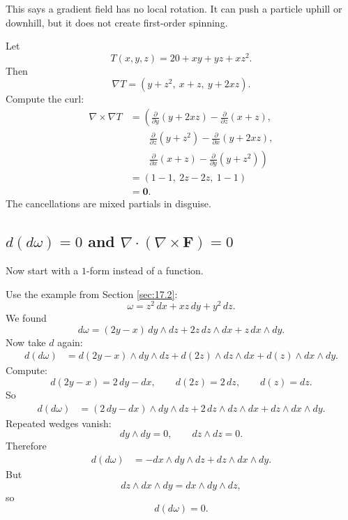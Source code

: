 This says a gradient field has no local rotation.  It can push a particle uphill or
downhill, but it does not create first-order spinning.

\begin{example}
Let
\[
    T(x,y,z)=20+xy+yz+xz^2.
\]
Then
\[
    \nabla T=(y+z^2,\ x+z,\ y+2xz).
\]
Compute the curl:
\[
\begin{aligned}
\nabla\times\nabla T
&=
\left(
\frac{\partial}{\partial y}(y+2xz)
-
\frac{\partial}{\partial z}(x+z),
\right.\\
&\qquad
\frac{\partial}{\partial z}(y+z^2)
-
\frac{\partial}{\partial x}(y+2xz),
\\
&\qquad\left.
\frac{\partial}{\partial x}(x+z)
-
\frac{\partial}{\partial y}(y+z^2)
\right)\\
&=
(1-1,\ 2z-2z,\ 1-1)\\
&=
\mathbf 0.
\end{aligned}
\]
The cancellations are mixed partials in disguise.
\end{example}

\subsection{\texorpdfstring{\(d(d\omega)=0\)}{d(d omega)=0} and
\texorpdfstring{\(\nabla\cdot(\nabla\times\mathbf F)=0\)}%
{div curl F = 0}}

Now start with a \(1\)-form instead of a function.

Use the example from Section \ref{sec:17.2}:
\[
    \omega=z^2\,dx+xz\,dy+y^2\,dz.
\]
We found
\[
    d\omega
    =
    (2y-x)\,dy\wedge dz
    +
    2z\,dz\wedge dx
    +
    z\,dx\wedge dy.
\]
Now take \(d\) again:
\[
\begin{aligned}
d(d\omega)
&=
d(2y-x)\wedge dy\wedge dz
+
d(2z)\wedge dz\wedge dx
+
d(z)\wedge dx\wedge dy.
\end{aligned}
\]
Compute:
\[
    d(2y-x)=2\,dy-dx,
    \qquad
    d(2z)=2\,dz,
    \qquad
    d(z)=dz.
\]
So
\[
\begin{aligned}
d(d\omega)
&=
(2\,dy-dx)\wedge dy\wedge dz
+
2\,dz\wedge dz\wedge dx
+
dz\wedge dx\wedge dy.
\end{aligned}
\]
Repeated wedges vanish:
\[
    dy\wedge dy=0,
    \qquad
    dz\wedge dz=0.
\]
Therefore
\[
\begin{aligned}
d(d\omega)
&=
-dx\wedge dy\wedge dz
+
dz\wedge dx\wedge dy.
\end{aligned}
\]
But
\[
    dz\wedge dx\wedge dy=dx\wedge dy\wedge dz,
\]
so
\[
\boxed{
    d(d\omega)=0.
}
\]

